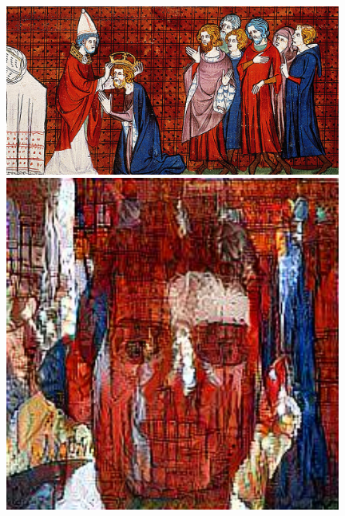 \documentclass{article}
\begin{document}
\begin{figure}[!htb]
\centering
\begin{minipage}{0.25\textwidth}
\centering
\includegraphics[width=0.98\textwidth]{../Images/charlemagne.jpg}
\end{minipage}%
\begin{minipage}{0.25\textwidth}
\centering
\includegraphics[width=0.98\textwidth]{../Images/transfer/tdf_charlemagne.jpg}
\end{minipage}%
\begin{minipage}{0.25\textwidth}
\centering

\end{minipage}
\end{figure}
\end{document}
